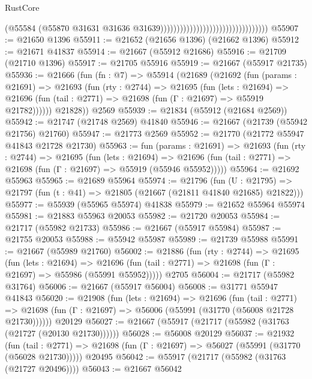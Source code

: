 \begin{lexlean}{RustCore}
\begin{coremodule}
                                                                  (@55584
                                                                    (@55870
                                                                      @31631
                                                                      @31636
                                                                      @31639)))))))))))))))))))))))))))))))))
@55907 := @21650 @1396
@55911 := @21652 (@21656 @1396) (@21662 @1396)
@55912 := @21671 @41837
@55914 := @21667 (@55912 @21686)
@55916 := @21709 (@21710 @1396)
@55917 := @21705 @55916
@55919 := @21667 (@55917 @21735)
@55936 := @21666
    (fun (fn : @7) =>
    @55914
      (@21689
        (@21692
          (fun (params : @21691) =>
          @21693
            (fun (rty : @2744) =>
            @21695
              (fun (lets : @21694) =>
              @21696 (fun (tail : @2771) => @21698 (fun (Γ : @21697) => @55919 @21782))))))
        @21828))
    @2569
@55939 := @21834 (@55912 (@21684 @2569))
@55942 := @21747 (@21748 @2569) @41840
@55946 := @21667 (@21739 (@55942 @21756) @21760)
@55947 := @21773 @2569
@55952 := @21770 (@21772 @55947 @41843 @21728 @21730)
@55963 := fun (params : @21691) =>
  @21693
    (fun (rty : @2744) =>
    @21695
      (fun (lets : @21694) =>
      @21696 (fun (tail : @2771) => @21698 (fun (Γ : @21697) => @55919 (@55946 @55952)))))
@55964 := @21692 @55963
@55965 := @21689 @55964
@55974 := @21796
    (fun (U : @21795) => @21797 (fun (t : @41) => @21805 (@21667 (@21811 @41840 @21685) @21822)))
@55977 := @55939 (@55965 @55974) @41838
@55979 := @21652 @55964 @55974
@55981 := @21883 @55963 @20053
@55982 := @21720 @20053
@55984 := @21717 (@55982 @21733)
@55986 := @21667 (@55917 @55984)
@55987 := @21755 @20053
@55988 := @55942 @55987
@55989 := @21739 @55988
@55991 := @21667 (@55989 @21760)
@56002 := @21886
    (fun (rty : @2744) =>
    @21695
      (fun (lets : @21694) =>
      @21696 (fun (tail : @2771) => @21698 (fun (Γ : @21697) => @55986 (@55991 @55952)))))
    @2705
@56004 := @21717 (@55982 @31764)
@56006 := @21667 (@55917 @56004)
@56008 := @31771 @55947 @41843
@56020 := @21908
    (fun (lets : @21694) =>
    @21696
      (fun (tail : @2771) =>
      @21698 (fun (Γ : @21697) => @56006 (@55991 (@31770 (@56008 @21728 @21730))))))
    @20129
@56027 := @21667 (@55917 (@21717 (@55982 (@31763 (@21727 (@20130 @21730))))))
@56028 := @56008 @20129
@56037 := @21932
    (fun (tail : @2771) => @21698 (fun (Γ : @21697) => @56027 (@55991 (@31770 (@56028 @21730)))))
    @20495
@56042 := @55917 (@21717 (@55982 (@31763 (@21727 @20496))))
@56043 := @21667 @56042

\end{coremodule}
\end{lexlean}
